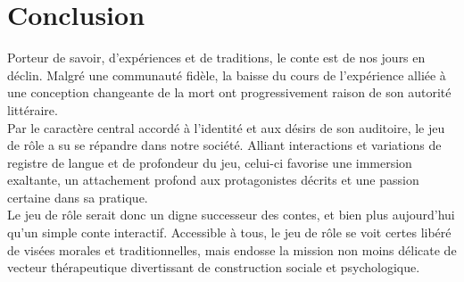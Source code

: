 \section*{Conclusion}

Porteur de savoir, d'expériences et de traditions, le conte est de nos jours en déclin. Malgré une communauté fidèle, la baisse du cours de l'expérience alliée à une conception changeante de la mort ont progressivement raison de son autorité littéraire.\\


Par le caractère central accordé à l'identité et aux désirs de son auditoire, le jeu de rôle a su se répandre dans notre société. Alliant interactions et variations de registre de langue et de profondeur du jeu, celui-ci favorise une immersion exaltante, un attachement profond aux protagonistes décrits et une passion certaine dans sa pratique.\\


Le jeu de rôle serait donc un digne successeur des contes, et bien plus aujourd'hui qu'un simple conte interactif. Accessible à tous, le jeu de rôle se voit certes libéré de visées morales et traditionnelles, mais endosse la mission non moins délicate de vecteur thérapeutique divertissant de construction sociale et psychologique.

\clearpage
